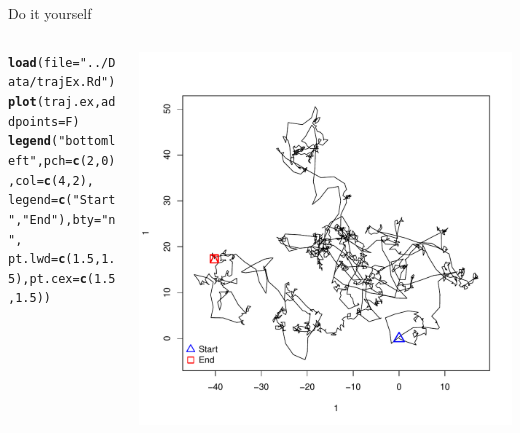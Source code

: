\documentclass{beamer}\usepackage[]{graphicx}\usepackage[]{color}
\makeatletter
\newcommand{\hlnum}[1]{\textcolor[rgb]{0.686,0.059,0.569}{#1}}%
\newcommand{\hlstr}[1]{\textcolor[rgb]{0.192,0.494,0.8}{#1}}%
\newcommand{\hlstd}[1]{\textcolor[rgb]{0.345,0.345,0.345}{#1}}%
\newcommand{\hlkwc}[1]{\textcolor[rgb]{0.333,0.667,0.333}{#1}}%
\newcommand{\hlkwd}[1]{\textcolor[rgb]{0.737,0.353,0.396}{\textbf{#1}}}%
\newenvironment{kframe}{%
 \def\at@end@of@kframe{}%
 \ifinner\ifhmode%
  \def\at@end@of@kframe{\end{minipage}}%
  \begin{minipage}{\columnwidth}%
 \fi\fi%
 \def\FrameCommand##1{\hskip\@totalleftmargin \hskip-\fboxsep
 \colorbox{shadecolor}{##1}\hskip-\fboxsep
     \hskip-\linewidth \hskip-\@totalleftmargin \hskip\columnwidth}%
 \MakeFramed {\advance\hsize-\width
   \@totalleftmargin\z@ \linewidth\hsize
   \@setminipage}}%
 {\par\unskip\endMakeFramed%
 \at@end@of@kframe}
\newenvironment{knitrout}{}{} %
\makeatother
\begin{document}
 
 \begin{frame}[fragile]{Do it yourself}

\begin{columns}
\begin{column}{0.4\textwidth}
\begin{knitrout}\tiny
{}\color{fgcolor}\begin{kframe}
\begin{alltt}
\hlkwd{load}\hlstd{(}\hlkwc{file}\hlstd{=}\hlstr{"../Data/trajEx.Rd"}\hlstd{)}
\hlkwd{plot}\hlstd{(traj.ex,} \hlkwc{addpoints} \hlstd{= F)}
\hlkwd{legend}\hlstd{(}\hlstr{"bottomleft"}\hlstd{,}\hlkwc{pch}\hlstd{=}\hlkwd{c}\hlstd{(}\hlnum{2}\hlstd{,} \hlnum{0}\hlstd{),} \hlkwc{col}\hlstd{=}\hlkwd{c}\hlstd{(}\hlnum{4}\hlstd{,}\hlnum{2}\hlstd{),}
       \hlkwc{legend}\hlstd{=}\hlkwd{c}\hlstd{(}\hlstr{"Start"}\hlstd{,} \hlstr{"End"}\hlstd{),} \hlkwc{bty} \hlstd{=} \hlstr{"n"}\hlstd{,}
       \hlkwc{pt.lwd} \hlstd{=} \hlkwd{c}\hlstd{(}\hlnum{1.5}\hlstd{,}\hlnum{1.5}\hlstd{),} \hlkwc{pt.cex} \hlstd{=} \hlkwd{c}\hlstd{(}\hlnum{1.5}\hlstd{,}\hlnum{1.5}\hlstd{))}
\end{alltt}
\end{kframe}
\end{knitrout}
\end{column}
\begin{column}{0.5\textwidth}
\includegraphics[scale=0.35]{Practical1-1.pdf}
\end{column}
\end{columns}
\end{frame}
\end{document}
